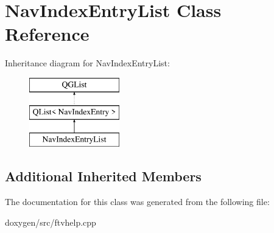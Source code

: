 \hypertarget{class_nav_index_entry_list}{}\section{Nav\+Index\+Entry\+List Class Reference}
\label{class_nav_index_entry_list}
Inheritance diagram for Nav\+Index\+Entry\+List\+:\begin{figure}[H]
\begin{center}
\leavevmode
\includegraphics[height=3.000000cm]{class_nav_index_entry_list}
\end{center}
\end{figure}
\subsection*{Additional Inherited Members}


The documentation for this class was generated from the following file\+:\begin{DoxyCompactItemize}
\item 
doxygen/src/ftvhelp.\+cpp\end{DoxyCompactItemize}
